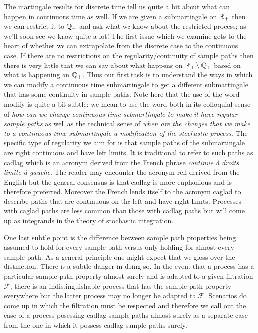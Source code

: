The martingale results for discrete time tell us quite a
bit about what can happen in continuous time as well.  If we are given
a submartingale on $\mathbb{R}_+$ then we can restrict it to
$\mathbb{Q}_+$ and ask what we know about the restricted process; as
we'll  soon see we know quite a lot!  The first issue which we examine
gets to the heart of whether we can extrapolate from the discrete case
to the continuous case.  If there are no restrictions on the
regularity/continuity of sample paths then there is very little that we can say
about what happens on $\mathbb{R}_+ \setminus \mathbb{Q}_+$ based on what
is happening on $\mathbb{Q}_+$.  Thus our first task is to understand
the ways in which we can modify a continuous time submartingale to get
a different submartingale that has some continuity in sample paths. Note here
that the use of the word modify is quite a bit subtle: we mean to use
the word both in its colloquial sense of \emph{how can we change
  continuous time submartingale to make it have regular sample paths}
as well as the technical sense of \emph{when are the changes that we
  make to a continuous time submartingale a modification of the
  stochastic process}.   The
specific type of regularity we aim for is that sample paths of the
submartingale are right continuous and have left limits.  It is
traditional to refer to such paths as cadlag which is an acronym
derived from the French phrase \emph{continue \`{a} droits limite
  \`{a} gauche}.  The reader may encounter the acronym rcll derived from
the English but the general consensus is that cadlag is more euphonious
and is therefore preferred.  Moreover the French lends itself to the
acronym caglad to describe paths that are continuous on the left and
have right limits.  Processes with caglad paths are less common than
those with cadlag paths but will come up as integrands in the theory
of stochastic integration.

One last subtle point is the difference between sample path properties
being assumed to hold for every sample path versus only holding for
almost every sample path.   As a general principle one might expect
that we gloss over the distinction.  There is a subtle danger in doing
so.  In the event that a process has a particular sample path property
almost surely and is adapted to a given filtration $\mathcal{F}$,
there is an indistinguishable process that has the sample path
property everywhere but the latter process may no longer be adapted to
$\mathcal{F}$.  Scenarios do come up in which the filtration must be
respected and therefore we call out the case of a process posessing
cadlag sample paths almost surely as a separate case from the one in
which it possess cadlag sample paths surely.


